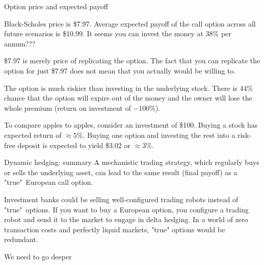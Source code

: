 \documentclass{beamer}
\begin{document}
\begin{frame}{Option price and expected payoff}

\justify
Black-Scholes price is \alert{\$7.97}. Average expected payoff of the call option across all future scenarios is \alert{\$10.99}. It seems you can invest the money at \alert{38\%} per annum???

\justify
\$7.97 is merely price of replicating the option. The fact that you can replicate the option for just \$7.97 does not mean that you actually would be willing to.

\justify
The option is much riskier than investing in the underlying stock. There is 44\% chance that the option will expire out of the money and the owner will lose the whole premium (return on investment of $-100\%$).

\justify
To compare apples to apples, consider an investment of \$100. Buying a stock has expected return of $\approx 5\%$.  Buying one option and investing the rest into a risk-free deposit is expected to yield \$3.02 or $\approx 3\%$.
\end{frame}



\begin{frame}{Dynamic hedging: summary}
\justify
A mechanistic trading strategy, which regularly buys or sells the underlying asset, can lead to the same result (final payoff) as a "true"\ European call option.

\justify
Investment banks could be selling well-configured trading robots instead of "true"\ options. If you want to buy a European option, you configure a trading robot and send it to the market to engage in delta hedging. In a world of zero transaction costs and perfectly liquid markets, "true" options would be redundant.

\end{frame}



\begin{frame}{We need to go deeper}
\centering
{}
\end{frame}
\end{document}
